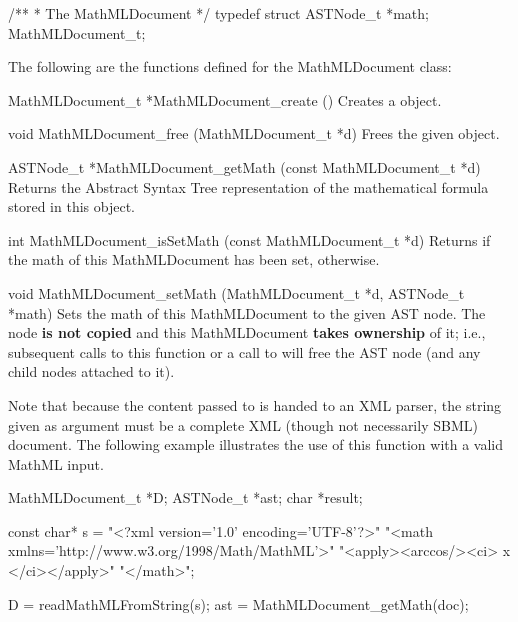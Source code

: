 \documentclass{sbmlmanual}
\begin{document}
\begin{example}[c]
/**
 * The MathMLDocument
 */
typedef struct
{
  ASTNode_t *math;
} MathMLDocument_t;
\end{example}  

The following are the functions defined for the MathMLDocument class:

\begin{methoddef}{MathMLDocument\_t *MathMLDocument\_create ()}
  Creates a  object.
\end{methoddef}

\begin{methoddef}{void MathMLDocument\_free (MathMLDocument\_t *d)}
  Frees the given  object.
\end{methoddef}

\begin{methoddef}{ASTNode\_t *MathMLDocument\_getMath (const MathMLDocument\_t *d)}
  Returns the Abstract Syntax Tree representation of the mathematical
  formula stored in this  object.
\end{methoddef}

\begin{methoddef}{int MathMLDocument\_isSetMath (const MathMLDocument\_t *d)}
  Returns  if the math of this MathMLDocument has been set, 
  otherwise.
\end{methoddef}

\begin{methoddef}{void MathMLDocument\_setMath (MathMLDocument\_t *d, ASTNode\_t *math)}
  Sets the math of this MathMLDocument to the given AST node.  The node
  \textbf{is not copied} and this MathMLDocument \textbf{takes ownership}
  of it; i.e., subsequent calls to this function or a call to
   will free the AST node (and any child
  nodes attached to it).
\end{methoddef}

Note that because the content passed to  is
handed to an XML parser, the string given as argument must be a complete
XML (though not necessarily SBML) document.  The following example
illustrates the use of this function with a valid MathML input.

\begin{example}[c]
MathMLDocument_t *D;
ASTNode_t          *ast;
char               *result;

const char* s = "<?xml version='1.0' encoding='UTF-8'?>"
                  "<math xmlns='http://www.w3.org/1998/Math/MathML'>"
                    "<apply><arccos/><ci> x </ci></apply>"
                  "</math>";

D      = readMathMLFromString(s);
ast    = MathMLDocument_getMath(doc);
\end{example}
\end{document}
